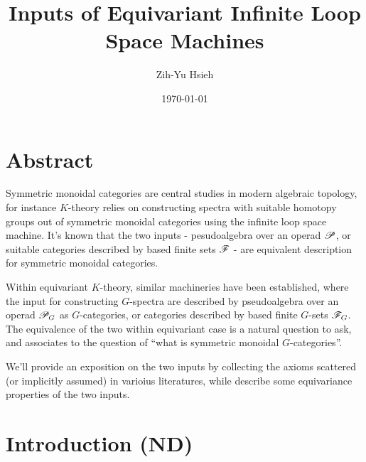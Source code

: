 \documentclass{article}
\title{Inputs of Equivariant Infinite Loop Space Machines}
\author{Zih-Yu Hsieh}
\date{\today}
\begin{document}
\maketitle
\tableofcontents


\newpage

\section{Abstract}

Symmetric monoidal categories are central studies in modern algebraic topology, for instance $K$-theory relies on constructing spectra with suitable homotopy groups out of symmetric monoidal categories using the infinite loop space machine. It's known that the two inputs - pesudoalgebra over an operad $\mathscr{P}$, or suitable categories described by based finite sets $\mathscr{F}$ - are equivalent description for symmetric monoidal categories. 

Within equivariant $K$-theory, similar machineries have been established, where the input for constructing $G$-spectra are described by pseudoalgebra over an operad $\mathscr{P}_G$ as $G$-categories, or categories described by based finite $G$-sets $\mathscr{F}_G$. The equivalence of the two within equivariant case is a natural question to ask, and associates to the question of ``what is symmetric monoidal $G$-categories''.

We'll provide an exposition on the two inputs by collecting the axioms scattered (or implicitly assumed) in varioius literatures, while describe some equivariance properties of the two inputs.

\section{Introduction (ND)}\label{sec_Intro}
\end{document}
